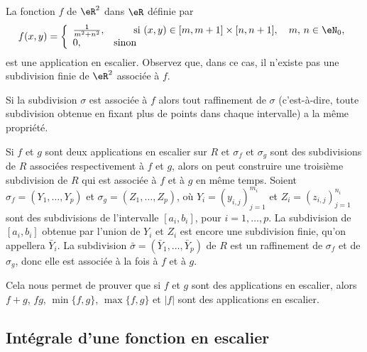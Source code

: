 \begin{example}
  La fonction $f$ de $\eR^2$ dans $\eR$ définie par
  \begin{equation}
    f(x,y)=\left\{
    \begin{array}{ll}
      \frac{1}{m^2+n^2},&\qquad \textrm{si } (x,y) \in [m,m+1]\times[n,n+1], \quad m,\,n\in\eN_0,\\
0, &\textrm{sinon}
    \end{array}\right.
  \end{equation}
est une application en escalier. Observez que, dans ce cas, il n'existe pas une subdivision finie de $\eR^2$ associée à $f$.
\end{example}
\begin{remark}
 Si la subdivision $\sigma$ est associée à $f$ alors tout raffinement de $\sigma$ (c'est-à-dire, toute subdivision obtenue en fixant plus de points dans chaque intervalle) a la même propriété.

Si $f$ et $g$ sont deux applications en escalier sur $R$ et $\sigma_f$ et $\sigma_g$ sont des subdivisions de $R$ associées respectivement à $f$ et $g$, alors on peut construire une troisième subdivision de $R$ qui est associée à $f$ et à $g$ en même temps. Soient $\sigma_f=(Y_{1},\ldots, Y_{p})$ et $\sigma_g=(Z_{1},\ldots, Z_{p})$, où $Y_{i}=(y_{i,j})_{j=1}^{m_i}$ et $Z_{i}=(z_{i,j})_{j=1}^{n_i}$ sont des subdivisions de l'intervalle $[a_i, b_i]$, pour $i=1,\ldots, p$. La subdivision de $[a_i, b_i]$ obtenue par l'union de $Y_i$ et $Z_i$ est encore une subdivision finie, qu'on appellera $\bar Y_i$. La subdivision $\bar \sigma = (\bar Y_{1},\ldots,\bar Y_{p})$ de $R$ est un raffinement de $\sigma_f $ et de $\sigma_g$, donc elle est associée à la fois à $f$ et à $g$.

Cela nous permet de prouver que si $f$ et $g$ sont des applications en escalier, alors $f+g$, $fg$, $\min\{f,g\}$, $\max\{f,g\}$ et $|f|$ sont des applications en escalier.
\end{remark}

\subsection{Intégrale d'une fonction en escalier}

